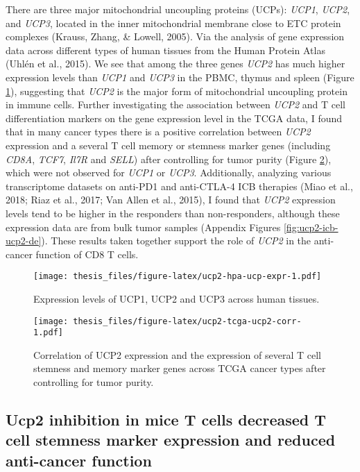 \documentclass[12pt,twoside,openany,\mydriver]{thesis}  %
\begin{document}
There are three major mitochondrial uncoupling proteins (UCPs): \emph{UCP1}, \emph{UCP2}, and \emph{UCP3}, located in the inner mitochondrial membrane close to ETC protein complexes (Krauss, Zhang, \& Lowell, 2005). Via the analysis of gene expression data across different types of human tissues from the Human Protein Atlas (Uhlén et al., 2015). We see that among the three genes \emph{UCP2} has much higher expression levels than \emph{UCP1} and \emph{UCP3} in the PBMC, thymus and spleen (Figure \ref{fig:ucp2-hpa-ucp-expr}), suggesting that \emph{UCP2} is the major form of mitochondrial uncoupling protein in immune cells. Further investigating the association between \emph{UCP2} and T cell differentiation markers on the gene expression level in the TCGA data, I found that in many cancer types there is a positive correlation between \emph{UCP2} expression and a several T cell memory or stemness marker genes (including \emph{CD8A}, \emph{TCF7}, \emph{Il7R} and \emph{SELL}) after controlling for tumor purity (Figure \ref{fig:ucp2-tcga-ucp2-corr}), which were not observed for \emph{UCP1} or \emph{UCP3}. Additionally, analyzing various transcriptome datasets on anti-PD1 and anti-CTLA-4 ICB therapies (Miao et al., 2018; Riaz et al., 2017; Van Allen et al., 2015), I found that \emph{UCP2} expression levels tend to be higher in the responders than non-responders, although these expression data are from bulk tumor samples (Appendix Figures \ref{fig:ucp2-icb-ucp2-de}). These results taken together support the role of \emph{UCP2} in the anti-cancer function of CD8 T cells.
\begin{figure}
\centering
\texttt{[image: thesis\_files/figure-latex/ucp2-hpa-ucp-expr-1.pdf]}
\caption{\label{fig:ucp2-hpa-ucp-expr}Expression levels of UCP1, UCP2 and UCP3 across human tissues.}
\end{figure}
\begin{figure}
\centering
\texttt{[image: thesis\_files/figure-latex/ucp2-tcga-ucp2-corr-1.pdf]}
\caption{\label{fig:ucp2-tcga-ucp2-corr}Correlation of UCP2 expression and the expression of several T cell stemness and memory marker genes across TCGA cancer types after controlling for tumor purity.}
\end{figure}
\hypertarget{ucp2-inhibition-in-mice-t-cells-decreased-t-cell-stemness-marker-expression-and-reduced-anti-cancer-function}{%
\subsection{Ucp2 inhibition in mice T cells decreased T cell stemness marker expression and reduced anti-cancer function}\label{ucp2-inhibition-in-mice-t-cells-decreased-t-cell-stemness-marker-expression-and-reduced-anti-cancer-function}}
\end{document}

